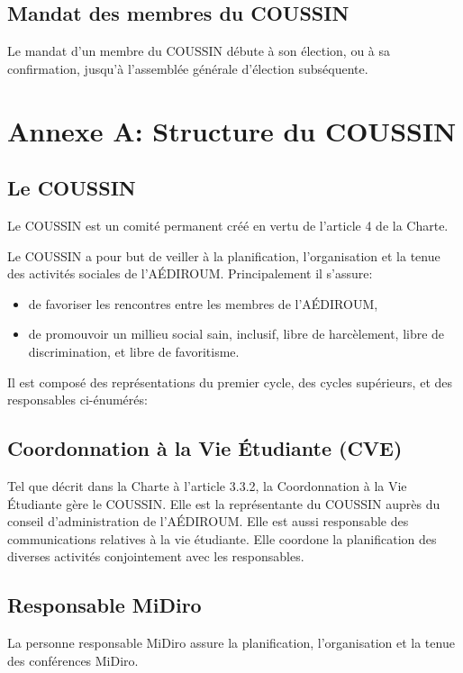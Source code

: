 \documentclass{aediroum}
\begin{document}
\subsection{Mandat des membres du COUSSIN}
Le mandat d'un membre du COUSSIN débute à son élection, ou à sa confirmation, jusqu'à l'assemblée générale d'élection subséquente.

\section{Annexe A: Structure du COUSSIN}

\setcounter{subsection}{-1}
\subsection{Le COUSSIN}
Le COUSSIN est un comité permanent créé en vertu de l'article 4 de la Charte.

Le COUSSIN a pour but de veiller à la planification, l'organisation et la tenue des activités sociales de l'AÉDIROUM. Principalement il s'assure:
\begin{itemize}
	\item de favoriser les rencontres entre les membres de l'AÉDIROUM,
	\item de promouvoir un millieu social sain, inclusif, libre de harcèlement, libre de discrimination, et libre de favoritisme.
\end{itemize}

Il est composé des représentations du premier cycle, des cycles supérieurs, et des responsables ci-énumérés:

\subsection{Coordonnation à la Vie Étudiante (CVE)}
Tel que décrit dans la Charte à l'article 3.3.2, la Coordonnation à la Vie Étudiante gère le COUSSIN. Elle est la représentante du COUSSIN auprès du conseil d'administration de l'AÉDIROUM. Elle est aussi responsable des communications relatives à la vie étudiante. Elle coordone la planification des diverses activités conjointement avec les responsables.

\subsection{Responsable MiDiro}
La personne responsable MiDiro assure la planification, l'organisation et la tenue des conférences MiDiro.
\end{document}
